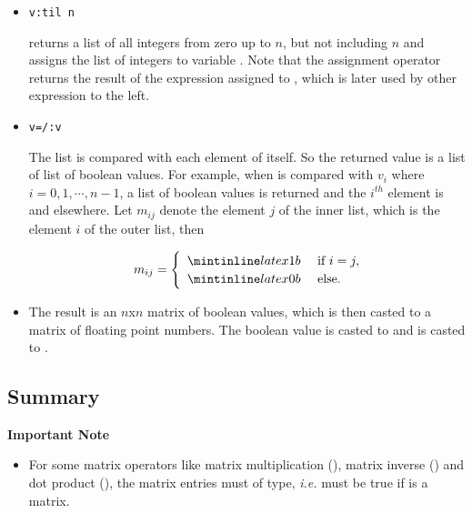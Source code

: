 \begin{itemize}
\item \begin{verbatim}
v:til n
\end{verbatim}
 returns a list of all integers from zero up to $n$, but not including $n$ and assigns the list of integers to variable . Note that the assignment operator returns the result of the expression assigned to , which is later used by other expression to the left.

\item \begin{verbatim}
v=/:v
\end{verbatim}
The list  is compared with each element of itself. So the returned value is a list of list of boolean values. For example, when  is compared with $v_i$ where $i = 0, 1, \cdots, n-1$, a list of boolean values is returned and the $i^{th}$ element is  and  elsewhere. Let $m_{ij}$ denote the element $j$ of the inner list, which is the element $i$ of the outer list, then 

$$
m_{ij} = 
\begin{cases}
\enspace \q{1b} & \text{ if } i=j, \\
\enspace \q{0b} & \text{ else. }
\end{cases}
$$

\item The result is an $n$x$n$ matrix of boolean values, which is then casted to a matrix of floating point numbers. The boolean value  is casted to  and  is casted to .
\end{itemize}


\subsection{Summary}

\begin{importantblock}
\textbf{Important Note}
\begin{itemize}
\item For some matrix operators like matrix multiplication (), matrix inverse () and dot product (\q{$}), the matrix entries must of  type, \emph{i.e.}  must be true if  is a matrix.
\end{itemize}
\end{importantblock}

